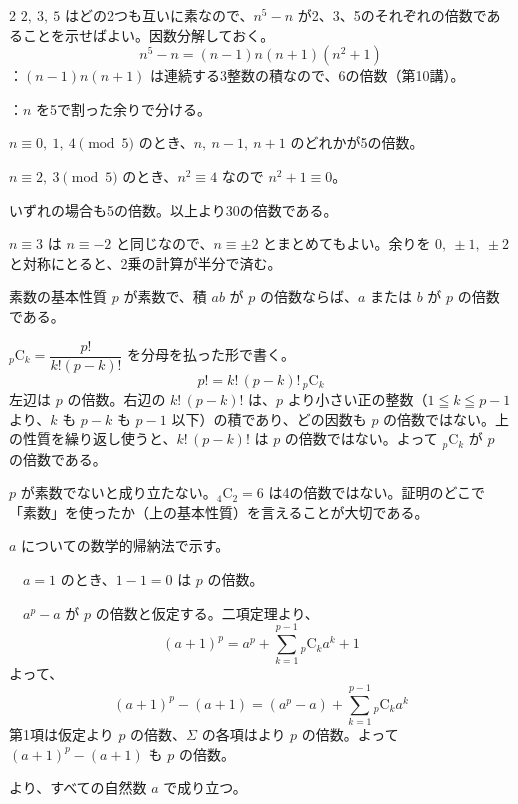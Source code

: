 \documentclass[paper=b5j, fontsize=8pt, fleqn, twoside]{jlreq}
\begin{document}
\begin{multicols*}{2}
  $2,\ 3,\ 5$ はどの2つも互いに素なので、$n^5-n$ が2、3、5のそれぞれの倍数であることを示せばよい。因数分解しておく。
  \[n^5-n=(n-1)n(n+1)(n^2+1)\]
  ：$(n-1)n(n+1)$ は連続する3整数の積なので、6の倍数（第10講）。\par
  ：$n$ を5で割った余りで分ける。\par
  $n\equiv0,\ 1,\ 4\pmod5$ のとき、$n,\ n-1,\ n+1$ のどれかが5の倍数。\par
  $n\equiv2,\ 3\pmod5$ のとき、$n^2\equiv4$ なので $n^2+1\equiv0$。\par
  いずれの場合も5の倍数。以上より30の倍数である。\QED

  \begin{memo}
    $n\equiv3$ は $n\equiv-2$ と同じなので、$n\equiv\pm2$ とまとめてもよい。余りを $0,\ \pm1,\ \pm2$ と対称にとると、2乗の計算が半分で済む。
  \end{memo}

  \begin{koushiki}{素数の基本性質}
    $p$ が素数で、積 $ab$ が $p$ の倍数ならば、$a$ または $b$ が $p$ の倍数である。
  \end{koushiki}
  ${}_p\mathrm C_k=\dfrac{p!}{k!(p-k)!}$ を分母を払った形で書く。
  \[p!=k!\,(p-k)!\,{}_p\mathrm C_k\]
  左辺は $p$ の倍数。右辺の $k!\,(p-k)!$ は、$p$ より小さい正の整数（$1\leqq k\leqq p-1$ より、$k$ も $p-k$ も $p-1$ 以下）の積であり、どの因数も $p$ の倍数ではない。上の性質を繰り返し使うと、$k!\,(p-k)!$ は $p$ の倍数ではない。よって ${}_p\mathrm C_k$ が $p$ の倍数である。\QED

  \begin{memo}
    $p$ が素数でないと成り立たない。${}_4\mathrm C_2=6$ は4の倍数ではない。証明のどこで「素数」を使ったか（上の基本性質）を言えることが大切である。
  \end{memo}

  $a$ についての数学的帰納法で示す。\par
  [Ⅰ]　$a=1$ のとき、$1-1=0$ は $p$ の倍数。\par
  [Ⅱ]　$a^p-a$ が $p$ の倍数と仮定する。二項定理より、
  \[(a+1)^p=a^p+\sum_{k=1}^{p-1}{}_p\mathrm C_ka^k+1\]
  よって、
  \[(a+1)^p-(a+1)=(a^p-a)+\sum_{k=1}^{p-1}{}_p\mathrm C_ka^k\]
  第1項は仮定より $p$ の倍数、$\Sigma$ の各項はより $p$ の倍数。よって $(a+1)^p-(a+1)$ も $p$ の倍数。\par
  [Ⅰ][Ⅱ]より、すべての自然数 $a$ で成り立つ。\QED


\end{multicols*}
\end{document}
